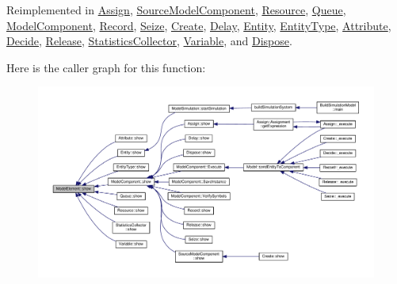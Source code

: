 Reimplemented in \hyperlink{class_assign_af5022b92204adcd9ee3e444b7e316d07}{Assign}, \hyperlink{class_source_model_component_a4011597b5780fcc0495e8e22ab8158f6}{Source\+Model\+Component}, \hyperlink{class_resource_a593cf83404dc90706943b4e60213fd01}{Resource}, \hyperlink{class_queue_ac78cc84cd91539c7f38d95dc17dabac5}{Queue}, \hyperlink{class_model_component_ad8bc846e36b028eab7efb7da6c549eca}{Model\+Component}, \hyperlink{class_record_aa2e77e0277c38e76541ec5811e0379ab}{Record}, \hyperlink{class_seize_a495ace3a156680b5816c8b285135322c}{Seize}, \hyperlink{class_create_a8d1832d2165bbeea4a5a88aded883f86}{Create}, \hyperlink{class_delay_af8187e4515417b547dc22b5ee0a1f95d}{Delay}, \hyperlink{class_entity_a86cc324050b451b31b134943e7978e36}{Entity}, \hyperlink{class_entity_type_ab5a696912b12a9f51decded90f368dea}{Entity\+Type}, \hyperlink{class_attribute_aa29f79466bd6ed5e36c402ec57cb2050}{Attribute}, \hyperlink{class_decide_a19e2a1143403795bcfd83903a1c0f695}{Decide}, \hyperlink{class_release_a1ec7b35553820f0f228f31be1df468c3}{Release}, \hyperlink{class_statistics_collector_a7ce8dad7e29d06c73a01d2ddee93fe00}{Statistics\+Collector}, \hyperlink{class_variable_a8bd0a772bb32fd630e252306306cd154}{Variable}, and \hyperlink{class_dispose_aee8ef98d5ca22eb18a97b258ed059865}{Dispose}.



Here is the caller graph for this function\+:\nopagebreak
\begin{figure}[H]
\begin{center}
\leavevmode
\includegraphics[width=350pt]{class_model_element_af084d684e8effe5cd4c2265abc98896c_icgraph}
\end{center}
\end{figure}


